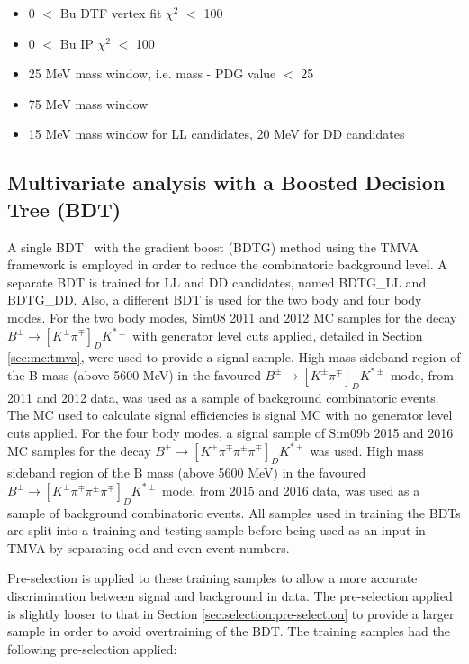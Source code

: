 \begin{itemize}
\item 0 $<$ Bu DTF vertex fit $\chi^2$ $<$ 100
\item 0 $<$ Bu IP $\chi^2$ $<$ 100
\item 25 MeV \Dz mass window, i.e. \textbar \Dz mass - PDG value \textbar $<$ 25 \mev
\item 75 MeV \Kstarm mass window
\item 15 MeV \KS mass window for LL candidates, 20 MeV for DD candidates
\end{itemize}

\subsection{Multivariate analysis with a Boosted Decision Tree (BDT)}
\label{sec:selection:bdt}

A single BDT~\cite{Breiman} with the gradient boost (BDTG) method using the TMVA framework is employed in order to reduce the combinatoric background level. A separate BDT is trained for LL and DD candidates, named BDTG\_LL and BDTG\_DD. Also, a different BDT is used for the two body and four body modes. For the two body modes, Sim08 2011 and 2012 MC samples for the decay $B^{\pm} \to [K^{\pm}\pi^{\mp}]_D K^{*\pm}$ with generator level cuts applied, detailed in Section \ref{sec:mc:tmva}, were used to provide a signal sample. High mass sideband region of the B mass (above 5600 MeV) in the favoured $B^{\pm} \to [K^{\pm}\pi^{\mp}]_D K^{*\pm}$ mode, from 2011 and 2012 data, was used as a sample of background combinatoric events. The MC used to calculate signal efficiencies is signal MC with no generator level cuts applied. For the four body modes, a signal sample of Sim09b 2015 and 2016 MC samples for the decay $B^{\pm} \to [K^{\pm}\pi^{\mp}\pi^{\pm}\pi^{\mp}]_D K^{*\pm}$ was used. High mass sideband region of the B mass (above 5600 MeV) in the favoured $B^{\pm} \to [K^{\pm}\pi^{\mp}\pi^{\pm}\pi^{\mp}]_D K^{*\pm}$ mode, from 2015 and 2016 data, was used as a sample of background combinatoric events. All samples used in training the BDTs are split into a training and testing sample before being used as an input in TMVA by separating odd and even event numbers.

Pre-selection is applied to these training samples to allow a more accurate discrimination between signal and background in data. The pre-selection applied is slightly looser to that in Section \ref{sec:selection:pre-selection} to provide a larger sample in order to avoid overtraining of the BDT. The training samples had the following pre-selection applied:

